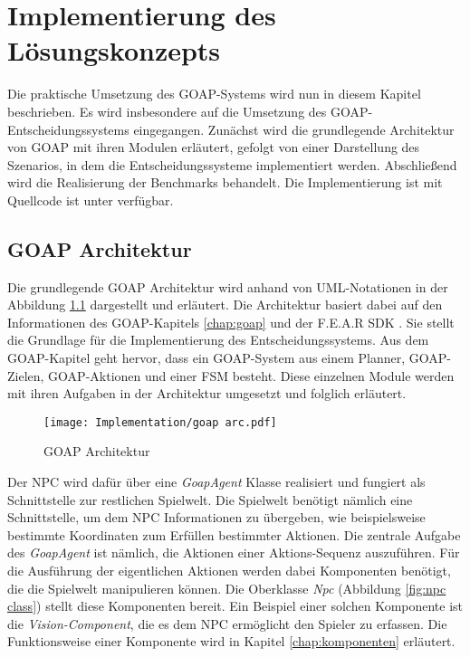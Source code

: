 \chapter{Implementierung des Lösungskonzepts}
\label{chap:implementierung lk}

Die praktische Umsetzung des GOAP-Systems wird nun in diesem Kapitel beschrieben. Es wird insbesondere auf die Umsetzung des GOAP-Entscheidungssystems eingegangen. Zunächst wird die grundlegende Architektur von GOAP mit ihren Modulen erläutert, gefolgt von einer Darstellung des Szenarios, in dem die Entscheidungssysteme implementiert werden. Abschlie\ss{}end wird die Realisierung der Benchmarks behandelt. Die Implementierung ist mit Quellcode ist unter \autocite{oleg} verfügbar.





\section{GOAP Architektur}
\label{chap:goap architektur}


Die grundlegende GOAP Architektur wird anhand von UML-Notationen in der Abbildung \ref{fig:GOAP Architektur} dargestellt und erläutert. Die Architektur basiert dabei auf den Informationen des GOAP-Kapitels \ref{chap:goap} und der F.E.A.R SDK \autocite{fearsdk}. Sie stellt die Grundlage für die Implementierung des Entscheidungssystems. Aus dem GOAP-Kapitel geht hervor, dass ein GOAP-System aus einem Planner, GOAP-Zielen, GOAP-Aktionen und einer FSM besteht. Diese einzelnen Module werden mit ihren Aufgaben in der Architektur umgesetzt und folglich erläutert.

\begin{figure}[h]
  \centering
  \texttt{[image: Implementation/goap arc.pdf]}
	\captionsetup{justification=justified, format=plain}
  \caption{GOAP Architektur}
  \label{fig:GOAP Architektur}
\end{figure}

Der NPC wird dafür über eine \textit{GoapAgent} Klasse realisiert und fungiert als Schnittstelle zur restlichen Spielwelt. Die Spielwelt benötigt nämlich eine Schnittstelle, um dem NPC Informationen zu übergeben, wie beispielsweise bestimmte Koordinaten zum Erfüllen bestimmter Aktionen. Die zentrale Aufgabe des \textit{GoapAgent} ist nämlich, die Aktionen einer Aktions-Sequenz auszuführen. Für die Ausführung der eigentlichen Aktionen werden dabei Komponenten benötigt, die die Spielwelt manipulieren können. Die Oberklasse \textit{Npc} (Abbildung \ref{fig:npc class}) stellt diese Komponenten bereit. Ein Beispiel einer solchen Komponente ist die \textit{Vision-Component}, die es dem NPC ermöglicht den Spieler zu erfassen. Die Funktionsweise einer Komponente wird in Kapitel \ref{chap:komponenten} erläutert.

